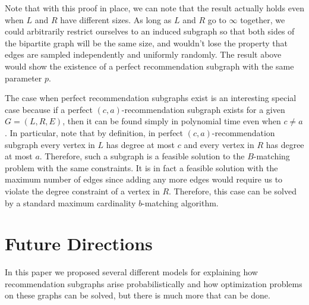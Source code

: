\documentclass[11pt]{article}
\newcommand{\vs}{\vspace{0.2cm}}
\begin{document}
Note that with this proof in place, we can note that the result actually holds even when $L$ and $R$ have different sizes. As long as $L$ and $R$ go to $\infty$ together, we could arbitrarily restrict ourselves to an induced subgraph so that both sides of the bipartite graph will be the same size, and wouldn't lose the property that edges are sampled independently and uniformly randomly. The result above would show the existence of a perfect recommendation subgraph with the same parameter $p$. \vs

The case when perfect recommendation subgraphs exist is an interesting special case because if  a perfect $(c,a)$-recommendation subgraph exists for a given $G=(L,R,E)$, then it can be found simply in polynomial time even when $c\ne a$. In particular, note that by definition, in perfect $(c,a)$-recommendation subgraph every vertex in $L$ has degree at most $c$ and every vertex in $R$ has degree at most $a$. Therefore, such a subgraph is a feasible solution to the $B$-matching problem with the same constraints. It is in fact a feasible solution with the maximum number of edges since adding any more edges would require us to violate the degree constraint of a vertex in $R$. Therefore, this case can be solved by a standard maximum cardinality $b$-matching algorithm.

\section{Future Directions}
In this paper we proposed several different models for explaining how
recommendation subgraphs arise probabilistically and how optimization 
problems on these graphs can be solved, but there is much more that
can be done.
\end{document}
